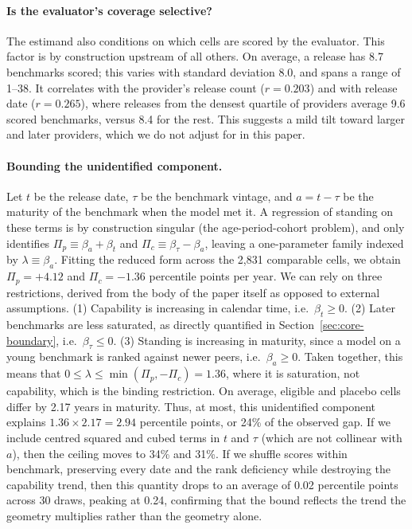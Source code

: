 \documentclass{article}
\begin{document}
\paragraph{Is the evaluator's coverage selective?}
The estimand also conditions on which cells are scored by the evaluator. This factor is by construction upstream of all others. On average, a release has 8.7 benchmarks scored; this varies with standard deviation 8.0, and spans a range of 1--38. It correlates with the provider's release count ($r = 0.203$) and with release date ($r = 0.265$), where releases from the densest quartile of providers average 9.6 scored benchmarks, versus 8.4 for the rest. This suggests a mild tilt toward larger and later providers, which we do not adjust for in this paper.

\paragraph{Bounding the unidentified component.}
Let $t$ be the release date, $\tau$ be the benchmark vintage, and $a = t - \tau$ be the maturity of the benchmark when the model met it. A regression of standing on these terms is by construction singular (the age-period-cohort problem), and only identifies $\Pi_p \equiv \beta_a + \beta_t$ and $\Pi_c \equiv \beta_\tau - \beta_a$, leaving a one-parameter family indexed by $\lambda \equiv \beta_a$. Fitting the reduced form across the 2,831 comparable cells, we obtain $\Pi_p = +4.12$ and $\Pi_c = -1.36$ percentile points per year. We can rely on three restrictions, derived from the body of the paper itself as opposed to external assumptions. (1) Capability is increasing in calendar time, i.e.\ $\beta_t \geq 0$. (2) Later benchmarks are less saturated, as directly quantified in Section~\ref{sec:core-boundary}, i.e.\ $\beta_\tau \leq 0$. (3) Standing is increasing in maturity, since a model on a young benchmark is ranked against newer peers, i.e.\ $\beta_a \geq 0$. Taken together, this means that $0 \leq \lambda \leq \min(\Pi_p, -\Pi_c) = 1.36$, where it is saturation, not capability, which is the binding restriction. On average, eligible and placebo cells differ by 2.17 years in maturity. Thus, at most, this unidentified component explains $1.36 \times 2.17 = 2.94$ percentile points, or 24\% of the observed gap. If we include centred squared and cubed terms in $t$ and $\tau$ (which are not collinear with $a$), then the ceiling moves to 34\% and 31\%. If we shuffle scores within benchmark, preserving every date and the rank deficiency while destroying the capability trend, then this quantity drops to an average of 0.02 percentile points across 30 draws, peaking at 0.24, confirming that the bound reflects the trend the geometry multiplies rather than the geometry alone.
\end{document}
